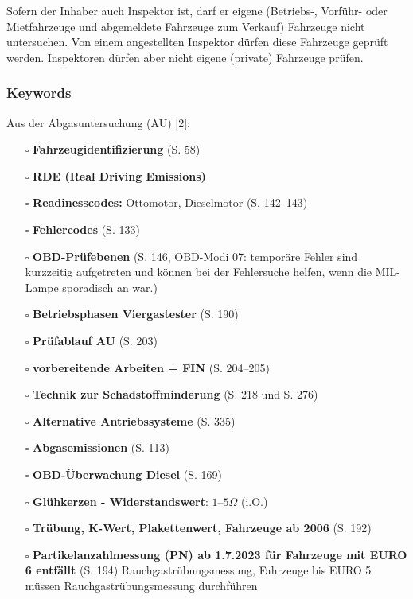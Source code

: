 \documentclass{vorlage-design-main}
\begin{document}
Sofern der Inhaber auch Inspektor ist, darf er eigene (Betriebs-,
Vorführ- oder Mietfahrzeuge und abgemeldete Fahrzeuge zum Verkauf)
Fahrzeuge nicht untersuchen. Von einem angestellten Inspektor dürfen
diese Fahrzeuge geprüft werden. Inspektoren dürfen aber nicht eigene
(private) Fahrzeuge prüfen.

\subsubsection{Keywords}\label{keywords}

Aus der Abgasuntersuchung (AU) {[}2{]}:

\begin{itemize}

\item[$\square$]
  \textbf{Fahrzeugidentifizierung} (S. 58)
\item[$\square$]
  \textbf{RDE (Real Driving Emissions)}
\item[$\square$]
  \textbf{Readinesscodes:} Ottomotor, Dieselmotor (S. 142--143)
\item[$\square$]
  \textbf{Fehlercodes} (S. 133)
\item[$\square$]
  \textbf{OBD-Prüfebenen} (S. 146, OBD-Modi 07: temporäre Fehler sind
  kurzzeitig aufgetreten und können bei der Fehlersuche helfen, wenn die
  MIL-Lampe sporadisch an war.)
\item[$\square$]
  \textbf{Betriebsphasen Viergastester} (S. 190)
\item[$\square$]
  \textbf{Prüfablauf AU} (S. 203)
\item[$\square$]
  \textbf{vorbereitende Arbeiten + FIN} (S. 204--205)
\item[$\square$]
  \textbf{Technik zur Schadstoffminderung} (S. 218 und S. 276)
\item[$\square$]
  \textbf{Alternative Antriebssysteme} (S. 335)
\item[$\square$]
  \textbf{Abgasemissionen} (S. 113)
\item[$\square$]
  \textbf{OBD-Überwachung Diesel} (S. 169)
\item[$\square$]
  \textbf{Glühkerzen - Widerstandswert}: $1–5 \Omega$ (i.O.)
\item[$\square$]
  \textbf{Trübung, K-Wert, Plakettenwert, Fahrzeuge ab 2006} (S. 192)
\item[$\square$]
  \textbf{Partikelanzahlmessung (PN) ab 1.7.2023 für Fahrzeuge mit EURO
  6 entfällt} (S. 194) Rauchgastrübungsmessung, Fahrzeuge bis EURO 5
  müssen Rauchgastrübungsmessung durchführen

\end{itemize}
\end{document}
